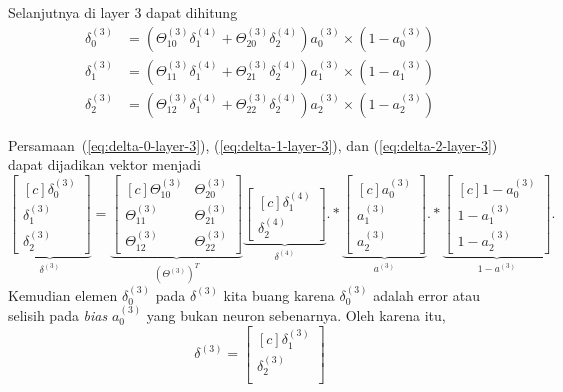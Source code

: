 \documentclass[12pt]{article}
\begin{document}
Selanjutnya di layer 3 dapat dihitung
\begin{align}
	\delta_0^{(3)} &= (\Theta_{10}^{(3)} \delta_1^{(4)} + \Theta_{20}^{(3)} \delta_2^{(4)}) a_0^{(3)} \times (1-a_0^{(3)}) \label{eq:delta-0-layer-3} \\
	\delta_1^{(3)} &= (\Theta_{11}^{(3)} \delta_1^{(4)} + \Theta_{21}^{(3)} \delta_2^{(4)}) a_1^{(3)} \times (1-a_1^{(3)}) \label{eq:delta-1-layer-3} \\
	\delta_2^{(3)} &= (\Theta_{12}^{(3)} \delta_1^{(4)} + \Theta_{22}^{(3)} \delta_2^{(4)}) a_2^{(3)} \times (1-a_2^{(3)})	\label{eq:delta-2-layer-3}
\end{align}

Persamaan~(\ref{eq:delta-0-layer-3}), (\ref{eq:delta-1-layer-3}), dan (\ref{eq:delta-2-layer-3}) dapat dijadikan vektor menjadi
\begin{equation}
	\underbrace{\begin{bmatrix}[c]
		\delta_0^{(3)} \\
		\delta_1^{(3)} \\
		\delta_2^{(3)}
	\end{bmatrix}}_{\delta^{(3)}}  = \underbrace{\begin{bmatrix}[c]
		\Theta_{10}^{(3)} & \Theta_{20}^{(3)} \\		
		\Theta_{11}^{(3)} & \Theta_{21}^{(3)} \\
		\Theta_{12}^{(3)} & \Theta_{22}^{(3)}
	\end{bmatrix}}_{(\Theta^{(3)})^T}  \underbrace{\begin{bmatrix}[c]
		\delta_1^{(4)} \\
		\delta_2^{(4)}
	\end{bmatrix}}_{\delta^{(4)}}  .* \underbrace{\begin{bmatrix}[c]
		a_0^{(3)} \\		
		a_1^{(3)} \\
		a_2^{(3)}
	\end{bmatrix}}_{a^{(3)}}  .* \underbrace{\begin{bmatrix}[c]
		1-a_0^{(3)} \\
		1-a_1^{(3)} \\
		1-a_2^{(3)}
	\end{bmatrix}}_{1-a^{(3)}}.
\end{equation}
Kemudian elemen $\delta_0^{(3)}$ pada $\delta^{(3)}$ kita buang karena $\delta_0^{(3)}$ adalah error atau selisih pada \textit{bias} $a_0^{(3)}$ yang bukan neuron sebenarnya. Oleh karena itu, 
\begin{equation}
	\delta^{(3)} = \begin{bmatrix}[c]
		\delta_1^{(3)} \\
		\delta_2^{(3)} \\		
	\end{bmatrix}
\end{equation}
\end{document}
